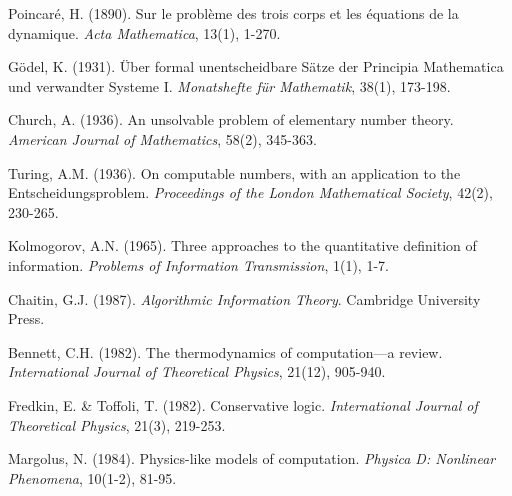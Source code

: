 \documentclass[11pt,a4paper]{article}
\theoremstyle{remark}
\begin{document}
\begin{thebibliography}{99}
Poincaré, H. (1890). Sur le problème des trois corps et les équations de la dynamique. \textit{Acta Mathematica}, 13(1), 1-270.

Gödel, K. (1931). Über formal unentscheidbare Sätze der Principia Mathematica und verwandter Systeme I. \textit{Monatshefte für Mathematik}, 38(1), 173-198.

Church, A. (1936). An unsolvable problem of elementary number theory. \textit{American Journal of Mathematics}, 58(2), 345-363.

Turing, A.M. (1936). On computable numbers, with an application to the Entscheidungsproblem. \textit{Proceedings of the London Mathematical Society}, 42(2), 230-265.

Kolmogorov, A.N. (1965). Three approaches to the quantitative definition of information. \textit{Problems of Information Transmission}, 1(1), 1-7.

Chaitin, G.J. (1987). \textit{Algorithmic Information Theory}. Cambridge University Press.

Bennett, C.H. (1982). The thermodynamics of computation—a review. \textit{International Journal of Theoretical Physics}, 21(12), 905-940.

Fredkin, E. \& Toffoli, T. (1982). Conservative logic. \textit{International Journal of Theoretical Physics}, 21(3), 219-253.

Margolus, N. (1984). Physics-like models of computation. \textit{Physica D: Nonlinear Phenomena}, 10(1-2), 81-95.

\end{thebibliography}
\end{document}
